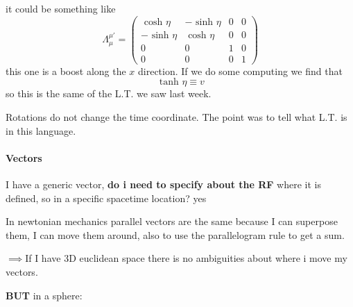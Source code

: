 it could be something like
\begin{equation} \Lambda^{\mu'}_{\mu } = 
\begin{pmatrix}
\text{ cosh } \eta  & - \text{ sinh } \eta   & 0 & 0 \\
- \text{ sinh } \eta  & \text{ cosh } \eta  & 0 & 0 \\
0 & 0 & 1 & 0 \\
0 & 0 & 0 & 1
\end{pmatrix} 
\end{equation}
this one is a boost along the $x$ direction. If we do some computing we find that 
\[
\text{ tanh } \eta \equiv v
\]
so this is the same of the L.T. we saw last week. \par

Rotations do not change the time coordinate. The point was to tell what L.T. is in this language.

\paragraph{Vectors}


I have a generic vector, \textbf{do i need to  specify about the RF} where it is defined, so in a specific spacetime location? {\tiny yes} \par

In newtonian mechanics parallel vectors are the same because I can superpose them, I can move them around, also to use the parallelogram rule to get a sum. \par
$\implies$If I have 3D euclidean space there is no ambiguities about where i move my vectors.\par
\textbf{BUT} in a sphere:

